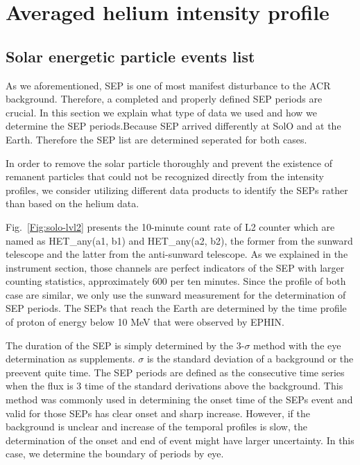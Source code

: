 \section{Averaged helium intensity profile}
\subsection*{Solar energetic particle events list}

As we aforementioned, \ac{SEP} is one of most manifest disturbance to the \ac{ACR} background. Therefore, a completed and properly defined \ac{SEP} periods are crucial. In this section we explain what type of data we used and how we determine the \ac{SEP} periods.Because \ac{SEP} arrived differently at \ac{SolO} and at the Earth. Therefore the \ac{SEP} list are determined seperated for both cases.

In order to remove the solar particle thoroughly and prevent the existence of remanent particles that could not be recognized directly from the intensity profiles, we consider utilizing different data products to identify the \acp{SEP} rather than based on the helium data.

Fig.~\ref{Fig:solo-lvl2} presents the 10-minute count rate of L2 counter which are named as HET\_any(a1, b1) and HET\_any(a2, b2), the former from the sunward telescope and the latter from the anti-sunward telescope. As we explained in the instrument section, those channels are perfect indicators of the \ac{SEP} with larger counting statistics, approximately 600 per ten minutes. Since the profile of both case are similar, we only use the sunward measurement for the determination of \ac{SEP} periods. The \acp{SEP} that reach the Earth are determined by the time profile of proton of energy below 10 MeV that were observed by \ac{EPHIN}.

The duration of the SEP is simply determined by the 3-$\sigma$ method with the eye determination as supplements. $\sigma$ is the standard deviation of a background or the preevent quite time. The \ac{SEP} periods are defined as the consecutive time series when the flux is 3 time of the standard derivations above the background. This method was commonly used in determining the onset time of the SEPs event and valid for those SEPs has clear onset and sharp increase. 
However, if the background is unclear and increase of the temporal profiles is slow, the determination of the onset and end of event might have larger uncertainty. In this case, we determine the boundary of periods by eye.


